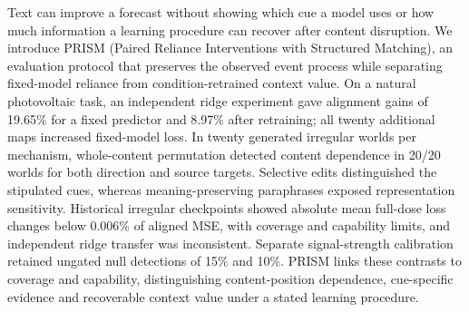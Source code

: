 Text can improve a forecast without showing which cue a model uses or how much information a learning procedure can recover after content disruption. We introduce PRISM (Paired Reliance Interventions with Structured Matching), an evaluation protocol that preserves the observed event process while separating fixed-model reliance from condition-retrained context value. On a natural photovoltaic task, an independent ridge experiment gave alignment gains of 19.65\% for a fixed predictor and 8.97\% after retraining; all twenty additional maps increased fixed-model loss. In twenty generated irregular worlds per mechanism, whole-content permutation detected content dependence in 20/20 worlds for both direction and source targets. Selective edits distinguished the stipulated cues, whereas meaning-preserving paraphrases exposed representation sensitivity. Historical irregular checkpoints showed absolute mean full-dose loss changes below 0.006\% of aligned MSE, with coverage and capability limits, and independent ridge transfer was inconsistent. Separate signal-strength calibration retained ungated null detections of 15\% and 10\%. PRISM links these contrasts to coverage and capability, distinguishing content-position dependence, cue-specific evidence and recoverable context value under a stated learning procedure.

